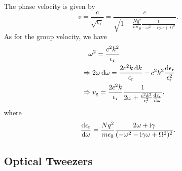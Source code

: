 \documentclass[hyperref, a4paper]{article}
\newcommand*{\ii}{\mathrm{i}}
\newcommand{\epsr}{\epsilon_{\text{r}}}
\begin{document}
The phase velocity is given by 
\begin{equation}
    v = \frac{c}{\sqrt{\epsr}} = \frac{c}{
        \sqrt{
            1 + \frac{N q^2}{m \epsilon_0} \frac{1}{- \omega^2 - \ii \gamma \omega + \Omega^2}
        }
    }.
\end{equation}
As for the group velocity, we have 
\begin{equation}
    \begin{aligned}
        &\quad \omega^2 = \frac{c^2 k^2}{\epsr} \\
        &\Rightarrow 2 \omega \dd{\omega} = 
        \frac{2 c^2 k \dd{k}}{\epsr} 
        - c^2 k^2 \frac{\dd{\epsr}}{\epsr^2} \\
        &\Rightarrow v_{\text{g}} = 
        \frac{2 c^2 k}{\epsr} \frac{1}{
            2 \omega + \frac{c^2 k^2}{\epsr^2} \dv{\epsr}{\omega}
        },
    \end{aligned}
\end{equation}
where 
\begin{equation}
    \dv{\epsr}{\omega} = \frac{N q^2}{m \epsilon_0}
    \frac{2 \omega + \ii \gamma}{(- \omega^2 - \ii \gamma \omega + \Omega^2)^2}.
\end{equation}

\subsubsection{}


\subsection{Optical Tweezers}

\todo{}
\end{document}
